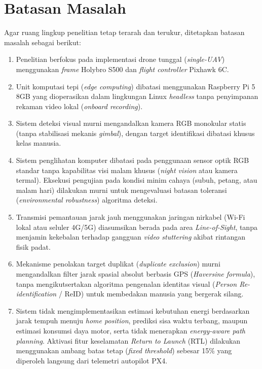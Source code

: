 \section{Batasan Masalah}
Agar ruang lingkup penelitian tetap terarah dan terukur, ditetapkan batasan masalah sebagai berikut:
\begin{enumerate}
	\item Penelitian berfokus pada implementasi drone tunggal (\textit{single-UAV}) menggunakan \textit{frame} Holybro S500 dan \textit{flight controller} Pixhawk 6C.
	\item Unit komputasi tepi (\textit{edge computing}) dibatasi menggunakan Raspberry Pi 5 8GB yang dioperasikan dalam lingkungan Linux \textit{headless} tanpa penyimpanan rekaman video lokal (\textit{onboard recording}).
	\item Sistem deteksi visual murni mengandalkan kamera RGB monokular statis (tanpa stabilisasi mekanis \textit{gimbal}), dengan target identifikasi dibatasi khusus kelas manusia.
	\item Sistem penglihatan komputer dibatasi pada penggunaan sensor optik RGB standar tanpa kapabilitas visi malam khusus (\textit{night vision} atau kamera termal). Eksekusi pengujian pada kondisi minim cahaya (subuh, petang, atau malam hari) dilakukan murni untuk mengevaluasi batasan toleransi (\textit{environmental robustness}) algoritma deteksi.
	\item Transmisi pemantauan jarak jauh menggunakan jaringan nirkabel (Wi-Fi lokal atau seluler 4G/5G) diasumsikan berada pada area \textit{Line-of-Sight}, tanpa menjamin kekebalan terhadap gangguan \textit{video stuttering} akibat rintangan fisik padat.
	\item Mekanisme penolakan target duplikat (\textit{duplicate exclusion}) murni mengandalkan filter jarak spasial absolut berbasis GPS (\textit{Haversine formula}), tanpa mengikutsertakan algoritma pengenalan identitas visual (\textit{Person Re-identification} / ReID) untuk membedakan manusia yang bergerak silang.
	\item Sistem tidak mengimplementasikan estimasi kebutuhan energi berdasarkan jarak tempuh menuju \textit{home position}, prediksi sisa waktu terbang, maupun estimasi konsumsi daya motor, serta tidak menerapkan \textit{energy-aware path planning}. Aktivasi fitur keselamatan \textit{Return to Launch} (RTL) dilakukan menggunakan ambang batas tetap (\textit{fixed threshold}) sebesar 15\% yang diperoleh langsung dari telemetri autopilot PX4.
\end{enumerate}

